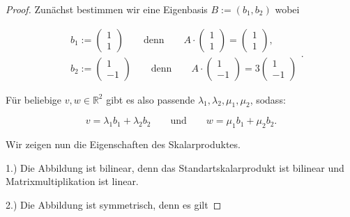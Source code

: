 \documentclass{article}
\newcommand{\RR}{\mathbb{R}}
\begin{document}
 \begin{proof}
    Zunächst bestimmen wir eine Eigenbasis
    $B := (b_1, b_2)$ wobei

    \[
    \begin{aligned}
        &b_1 := \begin{pmatrix}
            1 \\ 1
        \end{pmatrix}
        \qquad\text{denn}\qquad
        A \cdot \begin{pmatrix}
            1 \\ 1
        \end{pmatrix} = \begin{pmatrix}
            1 \\ 1
        \end{pmatrix},
        \\
        &b_2 := \begin{pmatrix}
            1 \\ -1
        \end{pmatrix}
        \qquad\text{denn}\qquad
        A \cdot \begin{pmatrix}
            1 \\ -1
        \end{pmatrix} = 3\begin{pmatrix}
            1 \\ -1
        \end{pmatrix}
    \end{aligned}.
    \]

    Für beliebige
    $v,w \in \RR^2$
    gibt es also passende
    $\lambda_1, \lambda_2, \mu_1, \mu_2$,
    sodass:

    \[
    v = \lambda_1 b_1 + \lambda_2 b_2
    \qquad\text{und}\qquad
    w = \mu_1 b_1 + \mu_2 b_2.
    \]
    
    Wir zeigen nun die Eigenschaften des Skalarproduktes.
    
    1.) Die Abbildung ist bilinear,
    denn das Standartskalarprodukt ist bilinear
    und Matrixmultiplikation ist linear.

    2.) Die Abbildung ist symmetrisch,
    denn es gilt


\end{proof}
\end{document}
